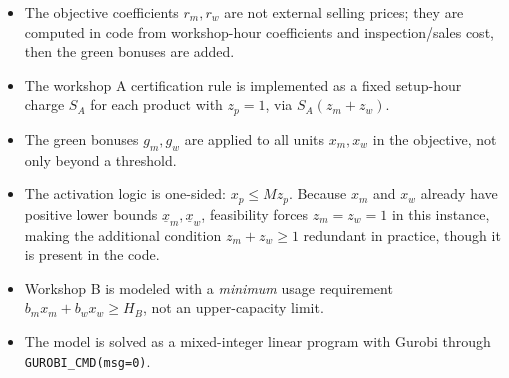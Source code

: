 \begin{itemize}
\item The objective coefficients \(r_m,r_w\) are not external selling prices; they are computed in code from workshop-hour coefficients and inspection/sales cost, then the green bonuses are added.
\item The workshop A certification rule is implemented as a fixed setup-hour charge \(S_A\) for each product with \(z_p=1\), via \(S_A(z_m+z_w)\).
\item The green bonuses \(g_m,g_w\) are applied to all units \(x_m,x_w\) in the objective, not only beyond a threshold.
\item The activation logic is one-sided: \(x_p \le M z_p\). Because \(x_m\) and \(x_w\) already have positive lower bounds \(\underline{x}_m,\underline{x}_w\), feasibility forces \(z_m=z_w=1\) in this instance, making the additional condition \(z_m+z_w\ge 1\) redundant in practice, though it is present in the code.
\item Workshop B is modeled with a \emph{minimum} usage requirement \(b_m x_m+b_w x_w \ge H_B\), not an upper-capacity limit.
\item The model is solved as a mixed-integer linear program with Gurobi through \texttt{GUROBI\_CMD(msg=0)}.
\end{itemize}
